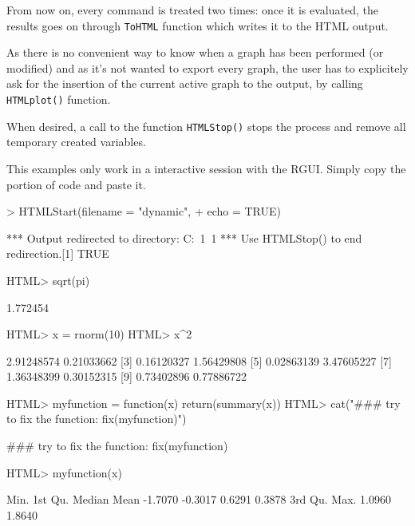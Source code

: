 \documentclass[a4paper]{article}
\begin{document}
From now on, every command is treated two times: once it is evaluated, the results goes on through \verb+ToHTML+ function which writes it to the HTML output. 

As there is no convenient way to know when a graph has been performed (or modified) and as it's not wanted to export every graph, the user has to explicitely ask for the insertion of the current active graph to the output, by calling \verb+HTMLplot()+ function.

When desired, a call to the function \verb+HTMLStop()+ stops the process and remove all temporary created variables.

This examples only work in a interactive session with the RGUI. Simply copy the portion of code and paste it.

\begin{Schunk}
\begin{Sinput}
> HTMLStart(filename = "dynamic", 
+     echo = TRUE)
\end{Sinput}
\begin{Soutput}
 *** Output redirected to directory:  C:\DOCUME~1\lecoutre\LOCALS~1\Temp{}
 *** Use HTMLStop() to end redirection.[1] TRUE
\end{Soutput}
\begin{Sinput}
HTML> sqrt(pi)
\end{Sinput}
\begin{Soutput}
[1] 1.772454
\end{Soutput}
\begin{Sinput}
HTML> x = rnorm(10)
HTML> x^2
\end{Sinput}
\begin{Soutput}
 [1] 2.91248574 0.21033662
 [3] 0.16120327 1.56429808
 [5] 0.02863139 3.47605227
 [7] 1.36348399 0.30152315
 [9] 0.73402896 0.77886722
\end{Soutput}
\begin{Sinput}
HTML> myfunction = function(x) return(summary(x))
HTML> cat("\n### try to fix the function: fix(myfunction)")
\end{Sinput}
\begin{Soutput}
### try to fix the function: fix(myfunction)
\end{Soutput}
\begin{Sinput}
HTML> myfunction(x)
\end{Sinput}
\begin{Soutput}
   Min. 1st Qu.  Median    Mean 
-1.7070 -0.3017  0.6291  0.3878 
3rd Qu.    Max. 
 1.0960  1.8640 
\end{Soutput}

\end{Schunk}
\end{document}
